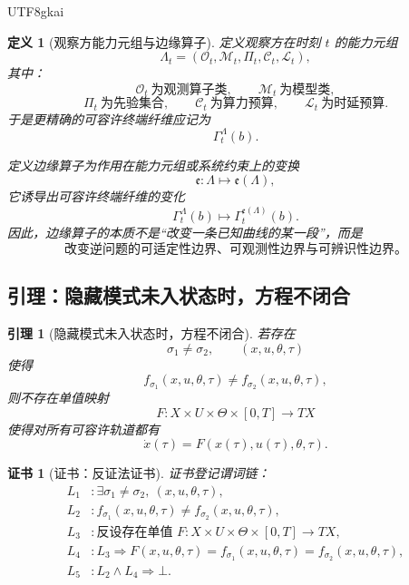 \documentclass[12pt]{article}
\newtheorem{definition}{定义}[section]
\newtheorem{lemma}{引理}[section]
\newtheorem{Certificate}{证书}[section]
\begin{document}
\begin{CJK*}{UTF8}{gkai}
\begin{definition}[观察方能力元组与边缘算子]
\label{def:tex1-ch2-capability-edge}
定义观察方在时刻 $t$ 的能力元组
\[
  \Lambda_t=(\mathcal O_t,\mathcal M_t,\Pi_t,\mathcal C_t,\mathcal L_t),
\]
其中：
\[
  \mathcal O_t\ \text{为观测算子类},\qquad
  \mathcal M_t\ \text{为模型类},
\]
\[
  \Pi_t\ \text{为先验集合},\qquad
  \mathcal C_t\ \text{为算力预算},\qquad
  \mathcal L_t\ \text{为时延预算}.
\]
于是更精确的可容许终端纤维应记为
\[
  \Gamma_t^{\Lambda}(b).
\]

定义边缘算子为作用在能力元组或系统约束上的变换
\[
  \mathfrak e:\Lambda\mapsto \mathfrak e(\Lambda),
\]
它诱导出可容许终端纤维的变化
\[
  \Gamma_t^{\Lambda}(b)\mapsto \Gamma_t^{\mathfrak e(\Lambda)}(b).
\]
因此，边缘算子的本质不是“改变一条已知曲线的某一段”，而是
\[
  \text{改变逆问题的可适定性边界、可观测性边界与可辨识性边界。}
\]
\end{definition}

\subsection{引理：隐藏模式未入状态时，方程不闭合}
\label{subsec:tex1-ch2-lemma-closure}

\begin{lemma}[隐藏模式未入状态时，方程不闭合]
\label{lem:tex1-ch2-hidden-mode}
若存在
\[
  \sigma_1\neq \sigma_2,
  \qquad
  (x,u,\theta,\tau)
\]
使得
\[
  f_{\sigma_1}(x,u,\theta,\tau)\neq f_{\sigma_2}(x,u,\theta,\tau),
\]
则不存在单值映射
\[
  F:X\times U\times \Theta\times [0,T]\to TX
\]
使得对所有可容许轨道都有
\[
  \dot x(\tau)=F(x(\tau),u(\tau),\theta,\tau).
\]
\end{lemma}

\begin{Certificate}[证书：反证法证书]
\label{cert:tex1-ch2-hidden-mode}
证书登记谓词链：
\[
\begin{aligned}
  L_1 &: \exists \sigma_1\neq \sigma_2,\ (x,u,\theta,\tau),\\
  L_2 &: f_{\sigma_1}(x,u,\theta,\tau)\neq f_{\sigma_2}(x,u,\theta,\tau),\\
  L_3 &: \text{反设存在单值 }F:X\times U\times \Theta\times[0,T]\to TX,\\
  L_4 &: L_3\Rightarrow
        F(x,u,\theta,\tau)=f_{\sigma_1}(x,u,\theta,\tau)
        =f_{\sigma_2}(x,u,\theta,\tau),\\
  L_5 &: L_2\wedge L_4\Rightarrow \bot.
\end{aligned}
\]
\end{Certificate}


\end{CJK*}
\end{document}

